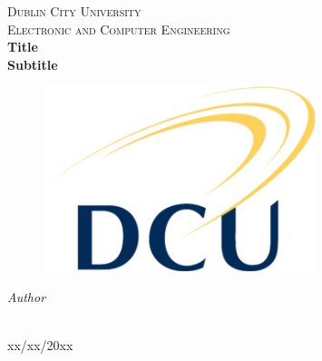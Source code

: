 \begin{titlepage}
  \begin{center}

    \textsc{\LARGE Dublin City University}\\[1cm]
    \textsc{\Large Electronic and Computer Engineering}\\[0.5cm]

    {\LARGE \bfseries Title\\[0.4cm]}
    {\Large \bfseries Subtitle\\[0.4cm]}

    \begin{figure}[H]
	\includegraphics{images/Dcu-logo.png}
	\centering
    \end{figure}

    \vskip 2cm
    \emph{Author}\\[0.1cm]
    \noindent{}\\[0.1cm]

    \vfill

    {\large{xx/xx/20xx}}

  \end{center}
\end{titlepage}
